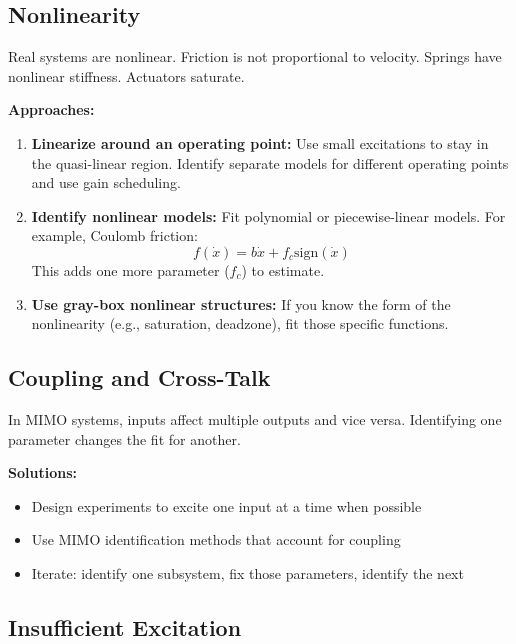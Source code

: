 \subsection{Nonlinearity}

Real systems are nonlinear. Friction is not proportional to velocity. Springs have nonlinear stiffness. Actuators saturate.

\textbf{Approaches:}
\begin{enumerate}
    \item \textbf{Linearize around an operating point:} Use small excitations to stay in the quasi-linear region. Identify separate models for different operating points and use gain scheduling.

    \item \textbf{Identify nonlinear models:} Fit polynomial or piecewise-linear models. For example, Coulomb friction:
    \begin{equation}
    f(\dot{x}) = b\dot{x} + f_c \text{sign}(\dot{x})
    \end{equation}
    This adds one more parameter ($f_c$) to estimate.

    \item \textbf{Use gray-box nonlinear structures:} If you know the form of the nonlinearity (e.g., saturation, deadzone), fit those specific functions.
\end{enumerate}

\subsection{Coupling and Cross-Talk}

In MIMO systems, inputs affect multiple outputs and vice versa. Identifying one parameter changes the fit for another.

\textbf{Solutions:}
\begin{itemize}
    \item Design experiments to excite one input at a time when possible
    \item Use MIMO identification methods that account for coupling
    \item Iterate: identify one subsystem, fix those parameters, identify the next
\end{itemize}

\subsection{Insufficient Excitation}

